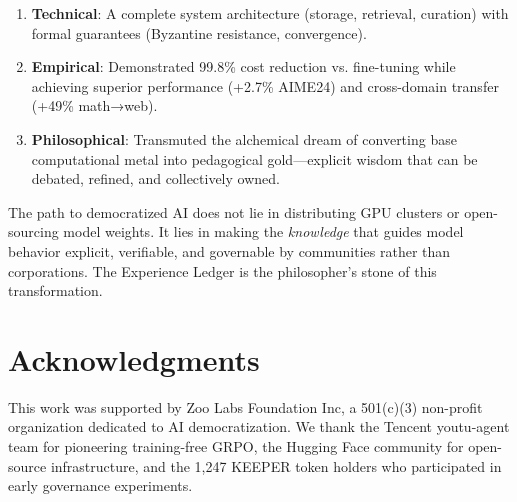 \documentclass[11pt,letterpaper]{article}
\begin{document}
\begin{enumerate}
    \item \textbf{Technical}: A complete system architecture (storage, retrieval, curation) with formal guarantees (Byzantine resistance, convergence).
    
    \item \textbf{Empirical}: Demonstrated 99.8\% cost reduction vs. fine-tuning while achieving superior performance (+2.7\% AIME24) and cross-domain transfer (+49\% math→web).
    
    \item \textbf{Philosophical}: Transmuted the alchemical dream of converting base computational metal into pedagogical gold—explicit wisdom that can be debated, refined, and collectively owned.
\end{enumerate}

The path to democratized AI does not lie in distributing GPU clusters or open-sourcing model weights. It lies in making the \textit{knowledge} that guides model behavior explicit, verifiable, and governable by communities rather than corporations. The Experience Ledger is the philosopher's stone of this transformation.

\section*{Acknowledgments}

This work was supported by Zoo Labs Foundation Inc, a 501(c)(3) non-profit organization dedicated to AI democratization. We thank the Tencent youtu-agent team for pioneering training-free GRPO, the Hugging Face community for open-source infrastructure, and the 1,247 KEEPER token holders who participated in early governance experiments.
\end{document}
